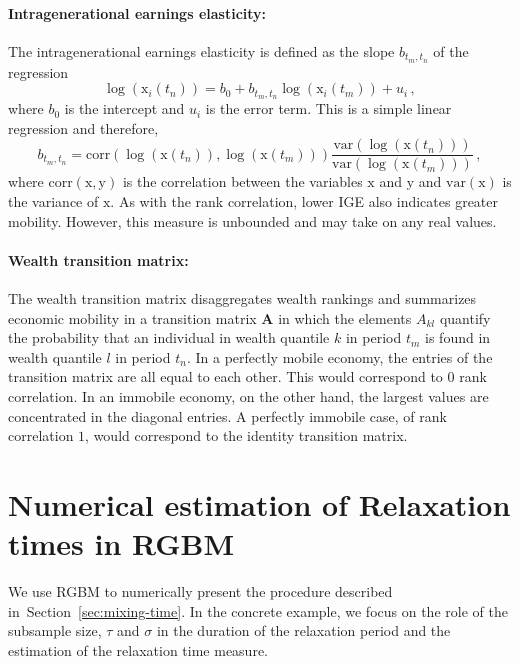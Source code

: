 \documentclass[11pt]{article}
\newcommand{\Sref}[1]{Section~\ref{sec:#1}}
\newcommand{\be}{\begin{equation}}
\newcommand{\ee}{\end{equation}}
\numberwithin{equation}{section}
\begin{document}
\paragraph{Intragenerational earnings elasticity:} The intragenerational earnings elasticity is defined as the slope $b_{t_m,t_n}$ of the regression
%
\be
   \log\left(\mathrm{x}_i\left(t_n\right)\right) = b_0 + b_{t_m,t_n} \log\left(\mathrm{x}_i\left(t_m\right)\right) + u_i\,,
\ee
%
where $b_0$ is the intercept and $u_i$ is the error term. This is a simple linear regression and therefore,
%
\be
    b_{t_m,t_n} = \mathrm{corr}\left(\log\left(\mathrm{x}\left(t_n\right)\right),\log\left(\mathrm{x}\left(t_m\right)\right)\right) \frac{\mathrm{var}\left(\log\left(\mathrm{x}\left(t_n\right)\right)\right)}{\mathrm{var}\left(\log\left(\mathrm{x}\left(t_m\right)\right)\right)}\,,
    \label{eq:iee-estimation}
\ee
%
where $\mathrm{corr}(\mathrm{x},\mathrm{y})$ is the correlation between the variables $\mathrm{x}$ and $\mathrm{y}$ and $\mathrm{var}(\mathrm{x})$ is the variance of $\mathrm{x}$. As with the rank correlation, lower IGE also indicates greater mobility. However, this measure is unbounded and may take on any real values.

\paragraph{Wealth transition matrix:} The wealth transition matrix disaggregates wealth rankings and summarizes economic mobility in a
transition matrix $\mathbf{A}$ in which the elements $A_{kl}$ quantify the probability that an individual in wealth quantile $k$ in period $t_m$ is found in wealth quantile $l$ in period $t_n$. In a perfectly mobile economy, the entries of the transition matrix are all equal to each other. This would correspond to $0$ rank correlation. In an immobile economy, on the other hand, the largest values are concentrated in the diagonal entries. A perfectly immobile case, of rank correlation $1$, would correspond to the identity transition matrix.

\section{Numerical estimation of Relaxation times in RGBM}\label{sec:rgbm-numerical-mixing-time}

We use RGBM to numerically present the procedure described in~\Sref{mixing-time}. In the concrete example, we focus on the role of the subsample size, $\tau$ and $\sigma$ in the duration of the relaxation period and the estimation of the relaxation time measure. 
\end{document}
